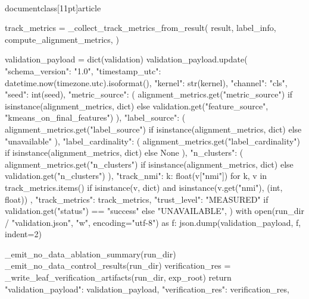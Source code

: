 \\documentclass[11pt]{article}
\begin{document}
\begin{CodeBlock}
    track_metrics = _collect_track_metrics_from_result(
        result,
        label_info,
        compute_alignment_metrics,
    )

    validation_payload = dict(validation)
    validation_payload.update(
        {
            "schema_version": "1.0",
            "timestamp_utc": datetime.now(timezone.utc).isoformat(),
            "kernel": str(kernel),
            "channel": "cls",
            "seed": int(seed),
            "metric_source": (
                alignment_metrics.get("metric_source")
                if isinstance(alignment_metrics, dict)
                else validation.get("feature_source", "kmeans_on_final_features")
            ),
            "label_source": (
                alignment_metrics.get("label_source")
                if isinstance(alignment_metrics, dict)
                else "unavailable"
            ),
            "label_cardinality": (
                alignment_metrics.get("label_cardinality")
                if isinstance(alignment_metrics, dict)
                else None
            ),
            "n_clusters": (
                alignment_metrics.get("n_clusters")
                if isinstance(alignment_metrics, dict)
                else validation.get("n_clusters")
            ),
            "track_nmi": {
                k: float(v["nmi"])
                for k, v in track_metrics.items()
                if isinstance(v, dict) and isinstance(v.get("nmi"), (int, float))
            },
            "track_metrics": track_metrics,
            "trust_level": "MEASURED" if validation.get("status") == "success" else "UNAVAILABLE",
        }
    )
    with open(run_dir / "validation.json", "w", encoding="utf-8") as f:
        json.dump(validation_payload, f, indent=2)

    _emit_no_data_ablation_summary(run_dir)
    _emit_no_data_control_results(run_dir)
    verification_res = _write_leaf_verification_artifacts(run_dir, exp_root)
    return {
        "validation_payload": validation_payload,
        "verification_res": verification_res,
    }



\end{CodeBlock}
\end{document}
